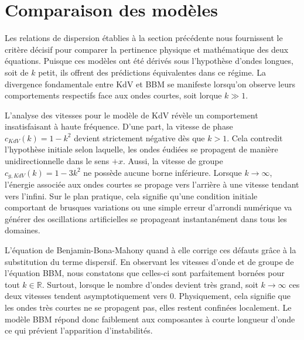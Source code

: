 \section{Comparaison des modèles}

Les relations de dispersion établies à la section précédente nous fournissent le critère décisif pour comparer la pertinence physique et mathématique des deux équations. Puisque ces modèles ont été dérivés sous l'hypothèse d'ondes longues, soit de $k$ petit, ils offrent des prédictions équivalentes dans ce régime. La divergence fondamentale entre KdV et BBM se manifeste lorsqu'on observe leurs comportements respectifs face aux ondes courtes, soit lorque $k \gg 1$.

L'analyse des vitesses pour le modèle de KdV révèle un comportement insatisfaisant à haute fréquence. D'une part, la vitesse de phase $c_{KdV}(k) = 1 - k^2$ devient strictement négative dès que $k > 1$. Cela contredit l'hypothèse initiale selon laquelle, les ondes éudiées se propagent de manière unidirectionnelle dans le sens $+x$. Aussi, la vitesse de groupe $c_{g,KdV}(k) = 1 - 3k^2$ ne possède aucune borne inférieure. Lorsque $k \to \infty$, l'énergie associée aux ondes courtes se propage vers l'arrière à une vitesse tendant vers l'infini. Sur le plan pratique, cela signifie qu'une condition initiale comportant de brusques variations ou une simple erreur d'arrondi numérique va générer des oscillations artificielles se propageant instantanément dans tous les domaines.

L'équation de Benjamin-Bona-Mahony quand à elle corrige ces défauts grâce à la substitution du terme dispersif. En observant les vitesses d'onde et de groupe de l'équation BBM, nous constatons que celles-ci sont parfaitement bornées pour tout $k \in \mathbb{R}$. Surtout, lorsque le nombre d'ondes devient très grand, soit $k \to \infty$ ces deux vitesses tendent asymptotiquement vers 0. Physiquement, cela signifie que les ondes très courtes ne se propagent pas, elles restent confinées localement. Le modèle BBM répond donc faiblement aux composantes à courte longueur d'onde ce qui prévient l'apparition d'instabilités. 


